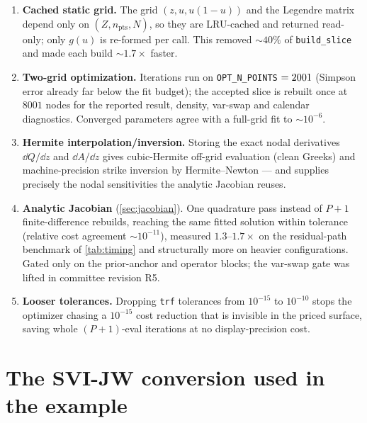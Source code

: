 \documentclass[11pt]{article}
\begin{document}
\begin{enumerate}[leftmargin=1.6em]
\item \textbf{Cached static grid.} The grid $(z,u,u(1-u))$ and the Legendre
matrix depend only on $(Z,n_{\text{pts}},N)$, so they are LRU-cached and returned
read-only; only $g(u)$ is re-formed per call. This removed $\sim40\%$ of
\texttt{build\_slice} and made each build $\sim1.7\times$ faster.
\item \textbf{Two-grid optimization.} Iterations run on \texttt{OPT\_N\_POINTS}
$=2001$ (Simpson error already far below the fit budget); the accepted
slice is rebuilt once at $8001$ nodes for the reported result, density, var-swap
and calendar diagnostics. Converged parameters agree with a full-grid fit to
$\sim10^{-6}$.
\item \textbf{Hermite interpolation/inversion.} Storing the exact nodal
derivatives $\dd Q/\dd z$ and $\dd A/\dd z$ gives cubic-Hermite off-grid
evaluation (clean Greeks) and machine-precision strike inversion by
Hermite--Newton --- and supplies precisely the nodal sensitivities the analytic
Jacobian reuses.
\item \textbf{Analytic Jacobian} (\cref{sec:jacobian}). One quadrature pass
instead of $P+1$ finite-difference rebuilds, reaching the same fitted solution
within tolerance (relative cost agreement $\sim10^{-11}$), measured
$1.3$--$1.7\times$ on the residual-path benchmark of \cref{tab:timing} and
structurally more on heavier configurations. Gated only on the prior-anchor
and operator blocks; the var-swap gate was lifted in committee revision R5.
\item \textbf{Looser tolerances.} Dropping \texttt{trf} tolerances from
$10^{-15}$ to $10^{-10}$ stops the optimizer chasing a $10^{-15}$ cost reduction
that is invisible in the priced surface, saving whole $(P+1)$-eval iterations at
no display-precision cost.
\end{enumerate}

\section{The SVI-JW conversion used in the example}
\label{app:svijw}
\end{document}
